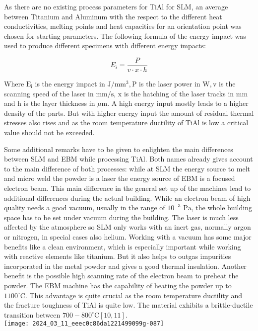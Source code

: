 \documentclass[10pt]{article}
\begin{document}
As there are no existing process parameters for TiAl for SLM, an average between Titanium and Aluminum with the respect to the different heat conductivities, melting points and heat capacities for an orientation point was chosen for starting parameters. The following formula of the energy impact was used to produce different specimens with different energy impacts:

$$
E_{i}=\frac{P}{v \cdot x \cdot h}
$$

Where $\mathrm{E}_{\mathrm{i}}$ is the energy impact in $\mathrm{J} / \mathrm{mm}^{3}, \mathrm{P}$ is the laser power in $\mathrm{W}, \mathrm{v}$ is the scanning speed of the laser in $\mathrm{mm} / \mathrm{s}$, $\mathrm{x}$ is the hatching of the laser tracks in $\mathrm{mm}$ and $\mathrm{h}$ is the layer thickness in $\mu \mathrm{m}$. A high energy input mostly leads to a higher density of the parts. But with higher energy input the amount of residual thermal stresses also rises and as the room temperature ductility of TiAl is low a critical value should not be exceeded.

Some additional remarks have to be given to enlighten the main differences between SLM and EBM while processing TiAl. Both names already gives account to the main difference of both processes: while at SLM the energy source to melt and micro weld the powder is a laser the energy source of EBM is a focused electron beam. This main difference in the general set up of the machines lead to additional differences during the actual building. While an electron beam of high quality needs a good vacuum, usually in the range of $10^{-3}$ $\mathrm{Pa}$, the whole building space has to be set under vacuum during the building. The laser is much less affected by the atmosphere so SLM only works with an inert gas, normally argon or nitrogen, in special cases also helium. Working with a vacuum has some major benefits like a clean environment, which is especially important while working with reactive elements like titanium. But it also helps to outgas impurities incorporated in the metal powder and gives a good thermal insulation. Another benefit is the possible high scanning rate of the electron beam to preheat the powder. The EBM machine has the capability of heating the powder up to $1100^{\circ} \mathrm{C}$. This advantage is quite crucial as the room temperature ductility and the fracture toughness of TiAl is quite low. The material exhibits a brittle-ductile transition between $700-800^{\circ} \mathrm{C}[10,11]$.\\
\texttt{[image: 2024\_03\_11\_eeec0c86da1221499099g-087]}
\end{document}

